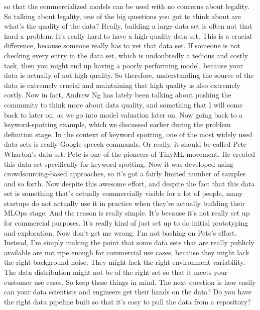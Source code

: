     so that the commercialized models can be used with no concerns about legality.
    So talking about legality, one of the big questions you got to think about
    are what's the quality of the data?
    Really, building a large data set is often not that hard a problem.
    It's really hard to have a high-quality data set.
    This is a crucial difference, because someone really
    has to vet that data set.
    If someone is not checking every entry in the data set, which is undoubtedly
    a tedious and costly task, then you might end up
    having a poorly performing model, because your data is actually
    of not high quality.
    So therefore, understanding the source of the data
    is extremely crucial and maintaining that high quality is also
    extremely costly.
    Now in fact, Andrew Ng has lately been talking
    about pushing the community to think more about data quality,
    and something that I will come back to later on, as we go into model valuation
    later on.
    Now going back to a keyword-spotting example,
    which we discussed earlier during the problem definition stage.
    In the context of keyword spotting, one of the most widely used data sets
    is really Google speech commands.
    Or really, it should be called Pete Wharton's data set.
    Pete is one of the pioneers of TinyML movement.
    He created this data set specifically for keyword spotting.
    Now it was developed using crowdsourcing-based approaches,
    so it's got a fairly limited number of samples and so forth.
    Now despite this awesome effort, and despite the fact
    that this data set is something that's actually
    commercially visible for a lot of people,
    many startups do not actually use it in practice
    when they're actually building their MLOps stage.
    And the reason is really simple.
    It's because it's not really set up for commercial purposes.
    It's really kind of just set up to do initial prototyping and exploration.
    Now don't get me wrong.
    I'm not bashing on Pete's effort.
    Instead, I'm simply making the point that some data sets
    that are really publicly available are not ripe
    enough for commercial use cases, because they might lack the right background
    noise.
    They might lack the right environment variability.
    The data distribution might not be of the right set so
    that it meets your customer use cases.
    So keep these things in mind.
    The next question is how easily can your data scientists and engineers
    get their hands on the data?
    Do you have the right data pipeline built
    so that it's easy to pull the data from a repository?
